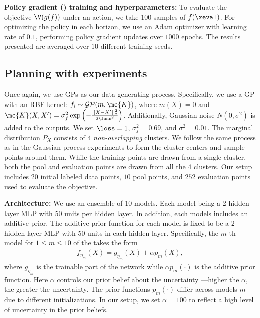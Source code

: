 \noindent\textbf{Policy gradient (\rein) training and hyperparameters:} To evaluate the objective $\V (g(f))$ under an action, we take $100$ samples of $f(\xeval)$.  For optimizing the policy in each horizon, we use an Adam optimizer with learning rate of $0.1$,  performing policy gradient updates over $1000$ epochs. The results presented are averaged over $10$ different training seeds.



\subsection{Planning with \ensembleplus experiments}

  Once again, we use {GP}s as our data generating process. Specifically, we use a GP with an RBF kernel: $f_i \sim \mathcal{GP}(m,\mc{K}) $, where $m(X)=0$ and $\mc{K}(X,X') = \sigma_f^2 \exp\left(-\frac{||X-X'||_2^2}{2\loss^2} \right)$. Additionally, Gaussian noise   $N(0,\sigma^2)$ is added to the outputs. We set $\loss = 1$, $\sigma_f^2 = 0.69$, and $\sigma^2 = 0.01$.
The marginal distribution $P_X$ consists of $4$ \textit{non-overlapping} clusters. We follow the same process as in the Gaussian process experiments to form the cluster centers and sample points around them. While the training points are drawn from a single cluster, both the pool and evaluation points are drawn from all the $4$ clusters. Our setup includes $20$ initial labeled data points, $10$ pool points, and $252$ evaluation points used to evaluate the objective. 


\noindent\textbf{\ensembleplus Architecture:} We use an ensemble of 10 models. Each model being a 2-hidden layer MLP with 50 units per hidden layer. In addition, each models includes an additive prior. The additive prior function for each model is fixed to be a 2-hidden layer MLP with 50 units in each hidden layer.  
 Specifically, the $m$-th model for $1\leq m \le 10$ of the \ensembleplus takes the form
\begin{align*}
    f_{\eta_m}(X) = g_{\eta_m}(X) + \alpha p_m(X),
\end{align*}
where $g_{\eta_m}$  is the trainable part of the network while $\alpha p_m(\cdot)$ is the additive prior function. Here $\alpha$ controls our prior belief about the uncertainty ---higher the $\alpha$, the greater the uncertainty. The prior functions $p_m(\cdot)$ differ across models $m$ due to different initializations. In our setup, we set $\alpha=100$ to reflect a high level of uncertainty in the prior beliefs.




